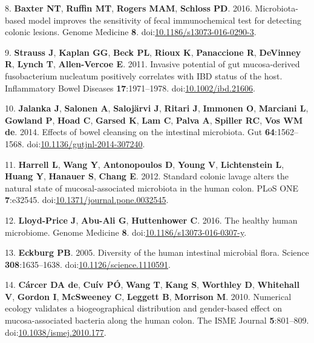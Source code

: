 \documentclass[11pt,]{article}
\begin{document}
\hypertarget{ref-Baxter2016}{}
8. \textbf{Baxter NT}, \textbf{Ruffin MT}, \textbf{Rogers MAM},
\textbf{Schloss PD}. 2016. Microbiota-based model improves the
sensitivity of fecal immunochemical test for detecting colonic lesions.
Genome Medicine \textbf{8}.
doi:\href{https://doi.org/10.1186/s13073-016-0290-3}{10.1186/s13073-016-0290-3}.

\hypertarget{ref-Strauss2011}{}
9. \textbf{Strauss J}, \textbf{Kaplan GG}, \textbf{Beck PL},
\textbf{Rioux K}, \textbf{Panaccione R}, \textbf{DeVinney R},
\textbf{Lynch T}, \textbf{Allen-Vercoe E}. 2011. Invasive potential of
gut mucosa-derived fusobacterium nucleatum positively correlates with
IBD status of the host. Inflammatory Bowel Diseases
\textbf{17}:1971--1978.
doi:\href{https://doi.org/10.1002/ibd.21606}{10.1002/ibd.21606}.

\hypertarget{ref-Jalanka2014}{}
10. \textbf{Jalanka J}, \textbf{Salonen A}, \textbf{Salojärvi J},
\textbf{Ritari J}, \textbf{Immonen O}, \textbf{Marciani L},
\textbf{Gowland P}, \textbf{Hoad C}, \textbf{Garsed K}, \textbf{Lam C},
\textbf{Palva A}, \textbf{Spiller RC}, \textbf{Vos WM de}. 2014. Effects
of bowel cleansing on the intestinal microbiota. Gut
\textbf{64}:1562--1568.
doi:\href{https://doi.org/10.1136/gutjnl-2014-307240}{10.1136/gutjnl-2014-307240}.

\hypertarget{ref-Harrell2012}{}
11. \textbf{Harrell L}, \textbf{Wang Y}, \textbf{Antonopoulos D},
\textbf{Young V}, \textbf{Lichtenstein L}, \textbf{Huang Y},
\textbf{Hanauer S}, \textbf{Chang E}. 2012. Standard colonic lavage
alters the natural state of mucosal-associated microbiota in the human
colon. PLoS ONE \textbf{7}:e32545.
doi:\href{https://doi.org/10.1371/journal.pone.0032545}{10.1371/journal.pone.0032545}.

\hypertarget{ref-LloydPrice2016}{}
12. \textbf{Lloyd-Price J}, \textbf{Abu-Ali G}, \textbf{Huttenhower C}.
2016. The healthy human microbiome. Genome Medicine \textbf{8}.
doi:\href{https://doi.org/10.1186/s13073-016-0307-y}{10.1186/s13073-016-0307-y}.

\hypertarget{ref-Eckburg2005}{}
13. \textbf{Eckburg PB}. 2005. Diversity of the human intestinal
microbial flora. Science \textbf{308}:1635--1638.
doi:\href{https://doi.org/10.1126/science.1110591}{10.1126/science.1110591}.

\hypertarget{ref-deCarcer2010}{}
14. \textbf{Cárcer DA de}, \textbf{Cuív PÓ}, \textbf{Wang T},
\textbf{Kang S}, \textbf{Worthley D}, \textbf{Whitehall V},
\textbf{Gordon I}, \textbf{McSweeney C}, \textbf{Leggett B},
\textbf{Morrison M}. 2010. Numerical ecology validates a biogeographical
distribution and gender-based effect on mucosa-associated bacteria along
the human colon. The ISME Journal \textbf{5}:801--809.
doi:\href{https://doi.org/10.1038/ismej.2010.177}{10.1038/ismej.2010.177}.
\end{document}

